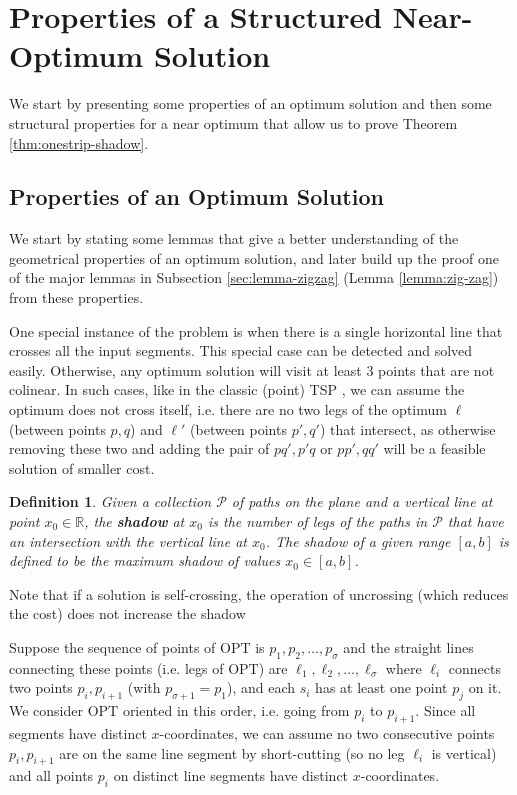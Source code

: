 \documentclass[10pt,a4paper]{amsart}
\theoremstyle{thmstyleone}
\newtheorem{definition}{Definition} %
\newtheorem{observation}{Observation} %
\newcommand{\RR}{\mathbb{R}}
\newcommand{\OPT}{{\text{OPT}}}
\begin{document}

\section{Properties of a Structured Near-Optimum Solution}\label{sec:properties}
We start by presenting some properties of an optimum solution and then some structural properties for a near 
optimum that allow us  to  prove Theorem \ref{thm:onestrip-shadow}.
\subsection{Properties of an Optimum Solution}\label{sec:opt-prop}

We start by stating some lemmas that give a better understanding of the geometrical properties of an optimum solution, and later build up the proof one of the major lemmas in Subsection \ref{sec:lemma-zigzag} 
(Lemma \ref{lemma:zig-zag}) from these properties.

One special instance of the problem is when there is a single horizontal line that crosses all the input segments.
This special case can be detected and solved easily. Otherwise, any optimum solution will visit at least
3 points that are not colinear. In such cases, like in the classic (point) TSP \cite{Arora98}, we can assume the optimum
does not cross itself, i.e. there are no two legs of the optimum $\ell$ (between points $p,q$) and $\ell'$ (between points $p',q'$) that intersect, as otherwise removing these two and adding the pair of $pq',p'q$ or $pp',qq'$ will be a feasible solution of smaller cost.

\begin{definition}\label{def:shadow}
    Given a collection $\mathcal  P$ of paths on the plane and a vertical line at point $x_0\in\RR$, the \textbf{shadow} at $x_0$ is the number of legs of the paths in $\mathcal  P$
    that have an intersection with the vertical line at $x_0$. The shadow of a given range $ [a, b] $ is defined to be the maximum shadow of values $ x_0 \in [a, b]$.
\end{definition}

Note that if a solution is self-crossing, the operation of uncrossing (which reduces the cost) does not increase the shadow

Suppose the sequence of points of $\OPT$ is $p_1,p_2,\ldots,p_\sigma$ and the straight lines connecting these points (i.e. legs of $\OPT$) are $\ell_1,\ell_2,\ldots,\ell_\sigma$
where $\ell_i$ connects two points $p_i,p_{i+1}$ (with $p_{\sigma+1}=p_1$), and each $s_i$ has at least one point $p_j$ on it. We consider $\OPT$ oriented in this order, i.e. going from $p_i$ to $p_{i+1}$. 
Since all segments have distinct $x$-coordinates, we can assume
	no two consecutive points $p_i,p_{i+1}$ are on the same line segment by short-cutting (so no leg $\ell_i$ is vertical) and all points $p_i$ on distinct line segments have distinct $x$-coordinates.
\end{document}
